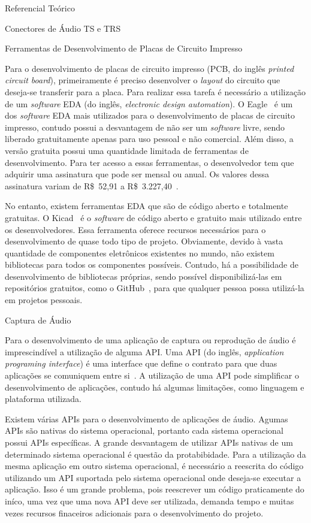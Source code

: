 \begin{chapter}{Referencial Teórico}
\begin{section}{Conectores de Áudio TS e TRS}
\end{section}


\begin{section}{Ferramentas de Desenvolvimento de Placas de Circuito Impresso}

Para o desenvolvimento de placas de circuito impresso (PCB, do inglês
\textit{printed circuit board}), primeiramente é
preciso desenvolver o \textit{layout} do circuito que deseja-se transferir
para a placa. Para realizar essa tarefa é necessário a utilização de um
\textit{software} EDA (do inglês, \textit{electronic design automation}). O
Eagle~\cite{eagle} é um dos \textit{software} EDA mais utilizados para o
desenvolvimento de placas de circuito impresso, contudo possui a desvantagem de
não ser um \textit{software} livre, sendo liberado gratuitamente apenas para uso
pessoal e não comercial. Além disso, a versão gratuita possui uma quantidade
limitada de ferramentas de desenvolvimento. Para ter acesso a essas ferramentas,
o desenvolvedor tem que adquirir uma assinatura que pode ser mensal ou anual. Os
valores dessa assinatura variam de R\$~52,91 a
R\$~3.227,40~\cite{EagleAssinatura}. 
 
No entanto, existem ferramentas EDA que são de código aberto e totalmente
gratuitas. O Kicad~\cite{kicad} é o  \textit{software} de código aberto e
gratuito mais utilizado entre os desenvolvedores. Essa ferramenta oferece
recursos necessários para o desenvolvimento de quase todo tipo de projeto.
Obviamente, devido à vasta quantidade de componentes eletrônicos existentes no
mundo, não existem bibliotecas para todos os componentes possíveis. Contudo, há
a possibilidade de desenvolvimento de bibliotecas próprias, sendo possível
disponibilizá-las em repositórios gratuitos, como o GitHub~\cite{github}, para
que qualquer pessoa possa utilizá-la em projetos pessoais.  
\end{section}


\begin{section}{Captura de Áudio}

Para o desenvolvimento de uma aplicação de captura ou reprodução de áudio é
imprescindível a utilização de alguma API. Uma API (do inglês,
\textit{application programing interface}) é uma interface que define o contrato
para que duas aplicações se comuniquem entre si~\cite{API17}. A utilização de
uma API pode simplificar o desenvolvimento de aplicações, contudo há algumas
limitações, como linguagem e plataforma utilizada. 

Existem várias APIs para o desenvolvimento de aplicações de áudio. Agumas APIs são
nativas do sistema operacional, portanto cada sistema operacional possui APIs
específicas. A grande desvantagem de utilizar APIs nativas de um determinado
sistema operacional é questão da protabibidade. Para a utilização da mesma aplicação em outro sistema
operacional, é necessário a reescrita do código utilizando um API suportada pelo
sistema operacional onde deseja-se executar a aplicação. Isso é um grande
problema, pois reescrever um código praticamente do iníco, uma vez que uma nova
API deve ser utilizada, demanda tempo e muitas vezes recursos finaceiros
adicionais para o desenvolvimento do projeto.



\end{section}
\end{chapter}
